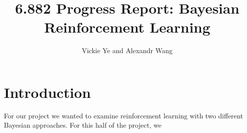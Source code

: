 \documentclass[11pt, twoside]{article}
\title{6.882 Progress Report: Bayesian Reinforcement Learning}
\date{}
\author {Vickie Ye and Alexandr Wang}
\begin{document}
\maketitle

\section{Introduction}
For our project we wanted to examine reinforcement learning with two different
Bayesian approaches. For this half of the project, we 



\end{document}
